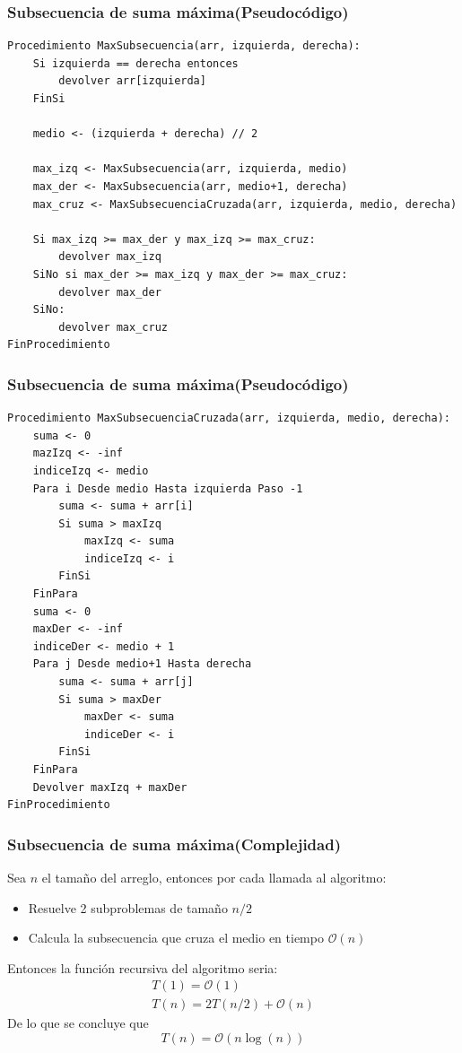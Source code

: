 \documentclass[10pt]{beamer}
\begin{document}
    \begin{frame}[fragile]
        \frametitle{Subsecuencia de suma máxima(Pseudocódigo)}
        \begin{lstlisting}[basicstyle=\ttfamily\scriptsize]
Procedimiento MaxSubsecuencia(arr, izquierda, derecha):
    Si izquierda == derecha entonces
        devolver arr[izquierda]
    FinSi

    medio <- (izquierda + derecha) // 2

    max_izq <- MaxSubsecuencia(arr, izquierda, medio)
    max_der <- MaxSubsecuencia(arr, medio+1, derecha)
    max_cruz <- MaxSubsecuenciaCruzada(arr, izquierda, medio, derecha)

    Si max_izq >= max_der y max_izq >= max_cruz:
        devolver max_izq
    SiNo si max_der >= max_izq y max_der >= max_cruz:
        devolver max_der
    SiNo:
        devolver max_cruz
FinProcedimiento
        \end{lstlisting}
    \end{frame}
    \begin{frame}[fragile]
        \frametitle{Subsecuencia de suma máxima(Pseudocódigo)}
        \begin{lstlisting}[basicstyle=\ttfamily\scriptsize]
Procedimiento MaxSubsecuenciaCruzada(arr, izquierda, medio, derecha):
    suma <- 0
    mazIzq <- -inf
    indiceIzq <- medio
    Para i Desde medio Hasta izquierda Paso -1
        suma <- suma + arr[i]
        Si suma > maxIzq
            maxIzq <- suma
            indiceIzq <- i
        FinSi
    FinPara
    suma <- 0
    maxDer <- -inf
    indiceDer <- medio + 1
    Para j Desde medio+1 Hasta derecha
        suma <- suma + arr[j]
        Si suma > maxDer
            maxDer <- suma
            indiceDer <- i
        FinSi
    FinPara
    Devolver maxIzq + maxDer
FinProcedimiento
        \end{lstlisting}
    \end{frame}

    \begin{frame}
        \frametitle{Subsecuencia de suma máxima(Complejidad)}
        Sea $n$ el tamaño del arreglo, entonces por cada llamada al algoritmo:
        \begin{itemize}
            \item Resuelve 2 subproblemas de tamaño $n/2$
            \item Calcula la subsecuencia que cruza el medio en tiempo $\mathcal{O}(n)$
        \end{itemize}
        Entonces la función recursiva del algoritmo seria:
        \begin{gather*}
            T(1) = \mathcal{O}(1) \\
            T(n) = 2T(n/2) + \mathcal{O}(n)
        \end{gather*}
        De lo que se concluye que
        \begin{equation*}
            T(n) = \mathcal{O}(n\log(n))
        \end{equation*}
    \end{frame}
\end{document}
